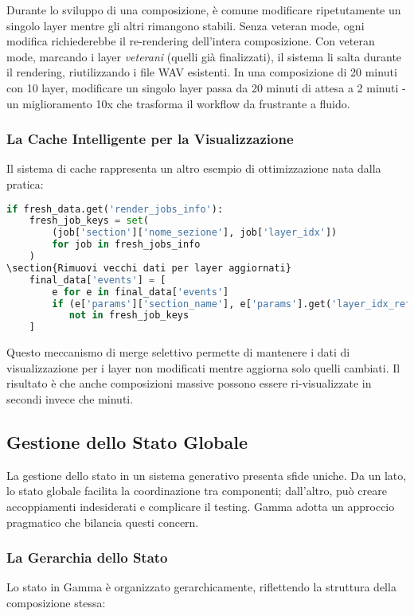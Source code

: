 Durante lo sviluppo di una composizione, è comune modificare ripetutamente un singolo layer mentre gli altri rimangono stabili. Senza veteran mode, ogni modifica richiederebbe il re-rendering dell'intera composizione. Con veteran mode, marcando i layer \textit{veterani} (quelli già finalizzati), il sistema li salta durante il rendering, riutilizzando i file WAV esistenti. In una composizione di 20 minuti con 10 layer, modificare un singolo layer passa da 20 minuti di attesa a 2 minuti - un miglioramento 10x che trasforma il workflow da frustrante a fluido.
\subsubsection{La Cache Intelligente per la Visualizzazione}
Il sistema di cache rappresenta un altro esempio di ottimizzazione nata dalla pratica:

\begin{lstlisting}[language=Python]
if fresh_data.get('render_jobs_info'):
    fresh_job_keys = set(
        (job['section']['nome_sezione'], job['layer_idx']) 
        for job in fresh_jobs_info
    )
\section{Rimuovi vecchi dati per layer aggiornati}
    final_data['events'] = [
        e for e in final_data['events']
        if (e['params']['section_name'], e['params'].get('layer_idx_ref')) 
           not in fresh_job_keys
    ]
\end{lstlisting}

Questo meccanismo di merge selettivo permette di mantenere i dati di visualizzazione per i layer non modificati mentre aggiorna solo quelli cambiati. Il risultato è che anche composizioni massive possono essere ri-visualizzate in secondi invece che minuti.
\subsection{Gestione dello Stato Globale}
La gestione dello stato in un sistema generativo presenta sfide uniche. Da un lato, lo stato globale facilita la coordinazione tra componenti; dall'altro, può creare accoppiamenti indesiderati e complicare il testing. Gamma adotta un approccio pragmatico che bilancia questi concern.
\subsubsection{La Gerarchia dello Stato}
Lo stato in Gamma è organizzato gerarchicamente, riflettendo la struttura della composizione stessa:

